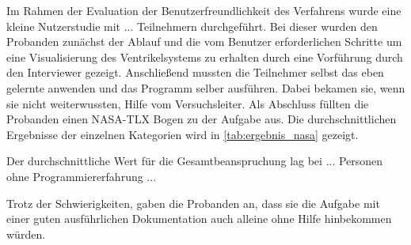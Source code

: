 Im Rahmen der Evaluation der Benutzerfreundlichkeit des Verfahrens wurde eine kleine Nutzerstudie mit ... Teilnehmern durchgeführt. Bei dieser wurden den Probanden zunächst der Ablauf und die vom Benutzer erforderlichen Schritte um eine Visualisierung des Ventrikelsystems zu erhalten durch eine Vorführung durch den Interviewer gezeigt. Anschließend mussten die Teilnehmer selbst das eben gelernte anwenden und das Programm selber ausführen. Dabei bekamen sie, wenn sie nicht weiterwussten, Hilfe vom Versuchsleiter. Als Abschluss füllten die Probanden einen NASA-TLX Bogen zu der Aufgabe aus. Die durchschnittlichen Ergebnisse der einzelnen Kategorien wird in \autoref{tab:ergebnis_nasa} gezeigt.


\begin{table}[h]
\centering
{}
\caption{Durchschnittlichen Ergebnisse des NASA-TLX Bogens}
\label{tab:ergebnis_nasa}
\end{table}


Der durchschnittliche Wert für die Gesamtbeanspruchung lag bei ... Personen ohne Programmiererfahrung ...

 
Trotz der Schwierigkeiten,  gaben die Probanden an, dass sie die Aufgabe mit einer guten ausführlichen Dokumentation auch alleine ohne Hilfe hinbekommen würden.



